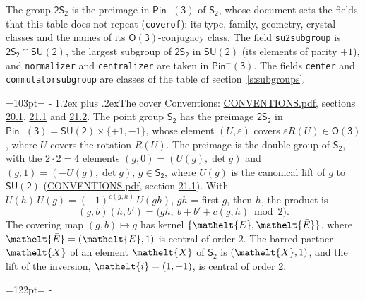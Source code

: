 \documentclass[10pt,a4paper]{article}
\makeatletter
\renewcommand\section{\@startsection{section}{1}{\z@}{-3ex plus -1ex minus -.2ex}%
  {1.2ex plus .2ex}{\normalfont\large\sffamily\bfseries\color{parttitle}}}
\newcommand{\needspace}[1]{\par\penalty-100\begingroup\dimen0=#1\relax\dimen2=\pagegoal
  \advance\dimen2-\pagetotal\ifdim\dimen0>\dimen2\relax\ifdim\dimen2>0pt\vfil\break\fi\fi
  \endgroup}
\numberwithin{equation}{section}
\newcommand{\eltfont}[1]{{\let\sigma\eltsigma\mathelt{#1}}}
\newcommand{\grp}[1]{\mathsf{#1}}
\newcommand{\elt}[1]{\eltfont{#1}}
\newcommand{\dirprod}{\times}
\newcommand{\barred}[1]{\bar{#1}}
\newcommand{\lift}[1]{\tilde{#1}}
\makeatother
\begin{document}
\leavevmode\label{n:element.inversion}\label{n:group.preimage}The group $\grp{2S_{2}}$ is the preimage in $\grp{Pin^{-}(3)}$ of \href{../../../rotation/data/pdf/S2.pdf}{$\grp{S_{2}}$}, whose document sets the fields that this table does not repeat (\texttt{coverof}): its type, family, geometry, crystal classes and the names of its \href{../../../rotation/data/pdf/O3.pdf}{$\grp{O(3)}$}-conjugacy class. The field \texttt{su2subgroup} is $\grp{2S_{2}} \cap \grp{SU(2)}$, the largest subgroup of $\grp{2S_{2}}$ in $\grp{SU(2)}$ (its elements of parity $+1$), and \texttt{normalizer} and \texttt{centralizer} are taken in $\grp{Pin^{-}(3)}$. The fields \texttt{center} and \texttt{commutatorsubgroup} are classes of the table of section~\ref{s:subgroups}.
\needspace{103pt}
\section{The cover}\label{s:cover}
Conventions: \href{../../CONVENTIONS.pdf}{CONVENTIONS.pdf}, sections \href{../../CONVENTIONS.pdf\#conv.20.1}{20.1}, \href{../../CONVENTIONS.pdf\#conv.21.1}{21.1} and \href{../../CONVENTIONS.pdf\#conv.21.2}{21.2}.
\leavevmode\label{n:group.pin.minus}\label{n:group.su2}\label{n:local.pin.sign}\label{n:matrix.covered}\label{n:matrix.lift.su2}\label{n:index.bar}The point group $\grp{S_{2}}$ has the preimage $\grp{2S_{2}}$ in $\grp{Pin^{-}(3)} = \grp{SU(2)} \dirprod \{+1, -1\}$, whose element $(U, \varepsilon)$ covers $\varepsilon R(U) \in \grp{O(3)}$, where $U$ covers the rotation $R(U)$. The preimage is the double group of $\grp{S_{2}}$, with the $2 \cdot 2 = 4$ elements $(g, 0) = (U(g), \det g)$ and $(g, 1) = (-U(g), \det g)$, $g \in \grp{S_{2}}$, where $U(g)$ is the canonical lift of $g$ to $\grp{SU(2)}$ (\href{../../CONVENTIONS.pdf}{CONVENTIONS.pdf}, section \href{../../CONVENTIONS.pdf\#conv.21.1}{21.1}). \label{n:function.cocycle}With $U(h)\,U(g) = (-1)^{c(g,h)}\,U(gh)$, $gh$ = first $g$, then $h$, the product is
\begin{equation}\label{e:product}(g, b)(h, b') = \bigl(gh,\ b + b' + c(g, h) \bmod 2\bigr).\end{equation}
\leavevmode\label{n:mark.bar}The covering map $(g, b) \mapsto g$ has kernel $\{\elt{E}, \elt{\barred{E}}\}$, where $\elt{\barred{E}} = (\elt{E}, 1)$ is central of order 2. \label{n:element.named}\label{n:mark.lift}The barred partner $\elt{\barred{X}}$ of an element $\elt{X}$ of $\grp{S_{2}}$ is $(\elt{X}, 1)$, and the lift of the inversion, $\elt{\lift{i}} = (1, -1)$, is central of order 2.
\needspace{122pt}
\end{document}
